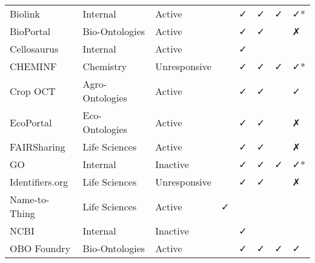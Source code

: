 \begin{table}
\begin{tabular}{llllllll}
        Biolink &        Internal &       Active &                           &                      ✓ &                              ✓ &                           ✓ &                     ✓* \\
      BioPortal &  Bio-Ontologies &       Active &                           &                      ✓ &                              ✓ &                             &                      ✗ \\
    Cellosaurus &        Internal &       Active &                           &                      ✓ &                                &                             &                        \\
        CHEMINF &       Chemistry & Unresponsive &                           &                      ✓ &                              ✓ &                           ✓ &                     ✓* \\
       Crop OCT & Agro-Ontologies &       Active &                           &                      ✓ &                              ✓ &                             &                      ✓ \\
      EcoPortal &  Eco-Ontologies &       Active &                           &                      ✓ &                              ✓ &                             &                      ✗ \\
    FAIRSharing &   Life Sciences &       Active &                           &                      ✓ &                              ✓ &                             &                      ✗ \\
             GO &        Internal &     Inactive &                           &                      ✓ &                              ✓ &                           ✓ &                     ✓* \\
Identifiers.org &   Life Sciences & Unresponsive &                           &                      ✓ &                              ✓ &                             &                      ✗ \\
  Name-to-Thing &   Life Sciences &       Active &                         ✓ &                        &                                &                             &                        \\
           NCBI &        Internal &     Inactive &                           &                      ✓ &                                &                             &                        \\
    OBO Foundry &  Bio-Ontologies &       Active &                           &                      ✓ &                              ✓ &                           ✓ &                      ✓ \\

\end{tabular}
\end{table}
